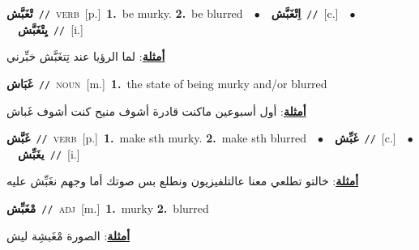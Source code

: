 \documentclass[10pt,a4paper,twoside]{article} %
\begin{document}
\begin{multicols}{2}
{\setlength\topsep{0pt}\textbf{\foreignlanguage{arabic}{تْغَبَّش}}\ {\color{gray}\texttt{//}\color{black}}\ \textsc{verb}\ [p.]\ \textbf{1.}~be murky.  \textbf{2.}~be blurred\ \ $\bullet$\ \ \setlength\topsep{0pt}\textbf{\foreignlanguage{arabic}{اِتْغَبَّش}}\ {\color{gray}\texttt{//}\color{black}}\ [c.]\ \ $\bullet$\ \ \setlength\topsep{0pt}\textbf{\foreignlanguage{arabic}{يِتْغَبَّش}}\ {\color{gray}\texttt{//}\color{black}}\ [i.]\  \begin{flushright}\color{gray}\foreignlanguage{arabic}{\textbf{\underline{\foreignlanguage{arabic}{أمثلة}}}: لما الرؤيا عند تِتغَبَّش خبِّرني}\end{flushright}\color{black}} \vspace{2mm}

{\setlength\topsep{0pt}\textbf{\foreignlanguage{arabic}{غَبَاش}}\ {\color{gray}\texttt{//}\color{black}}\ \textsc{noun}\ [m.]\ \textbf{1.}~the state of being murky and/or blurred\  \begin{flushright}\color{gray}\foreignlanguage{arabic}{\textbf{\underline{\foreignlanguage{arabic}{أمثلة}}}: أول أسبوعين ماكنت قادرة أشوف منيح كنت أشوف غَباش}\end{flushright}\color{black}} \vspace{2mm}

{\setlength\topsep{0pt}\textbf{\foreignlanguage{arabic}{غَبَّش}}\ {\color{gray}\texttt{//}\color{black}}\ \textsc{verb}\ [p.]\ \textbf{1.}~make sth murky.  \textbf{2.}~make sth blurred\ \ $\bullet$\ \ \setlength\topsep{0pt}\textbf{\foreignlanguage{arabic}{غَبِّش}}\ {\color{gray}\texttt{//}\color{black}}\ [c.]\ \ $\bullet$\ \ \setlength\topsep{0pt}\textbf{\foreignlanguage{arabic}{يغَبِّش}}\ {\color{gray}\texttt{//}\color{black}}\ [i.]\  \begin{flushright}\color{gray}\foreignlanguage{arabic}{\textbf{\underline{\foreignlanguage{arabic}{أمثلة}}}: خالتو تطلعي معنا عالتلفيزيون ونطلع بس صوتك أما وجهم نغَبِّش عليه}\end{flushright}\color{black}} \vspace{2mm}

{\setlength\topsep{0pt}\textbf{\foreignlanguage{arabic}{مْغَبِّش}}\ {\color{gray}\texttt{//}\color{black}}\ \textsc{adj}\ [m.]\ \textbf{1.}~murky  \textbf{2.}~blurred\  \begin{flushright}\color{gray}\foreignlanguage{arabic}{\textbf{\underline{\foreignlanguage{arabic}{أمثلة}}}: الصورة مْغَبشِة ليش}\end{flushright}\color{black}} \vspace{2mm}


\end{multicols}
\end{document}

